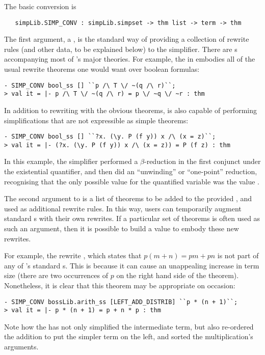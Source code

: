 The basic conversion is
\begin{hol}
\begin{verbatim}
   simpLib.SIMP_CONV : simpLib.simpset -> thm list -> term -> thm
\end{verbatim}
\end{hol}
The first argument, a \simpset, is the standard way of providing a
collection of rewrite rules (and other data, to be explained below) to
the simplifier.  There are \simpset{}s accompanying most of \HOL's
major theories.  For example, the \simpset{} 
in  embodies all of the usual rewrite theorems one would want over boolean
formulas:
\setcounter{sessioncount}{0}
\begin{session}
\begin{verbatim}
- SIMP_CONV bool_ss [] ``p /\ T \/ ~(q /\ r)``;
> val it = |- p /\ T \/ ~(q /\ r) = p \/ ~q \/ ~r : thm
\end{verbatim}
\end{session}
In addition to rewriting with the obvious theorems,  is
also capable of performing simplifications that are not expressible as
simple theorems:
\begin{session}
\begin{verbatim}
- SIMP_CONV bool_ss [] ``?x. (\y. P (f y)) x /\ (x = z)``;
> val it = |- (?x. (\y. P (f y)) x /\ (x = z)) = P (f z) : thm
\end{verbatim}
\end{session}
In this example, the simplifier performed a $\beta$-reduction in the
first conjunct under the existential quantifier, and then did an
``unwinding'' or ``one-point'' reduction, recognising that the only
possible value for the quantified variable  was the value
.

The second argument to  is a list of theorems to be
added to the provided \simpset, and used as additional rewrite rules.
In this way, users can temporarily augment standard \simpset{}s with
their own rewrites.  If a particular set of theorems is often used as
such an argument, then it is possible to build a \simpset{} value to
embody these new rewrites.

For example, the rewrite , which
states that $p(m + n) = pm + pn$ is not part of any of \HOL's standard
\simpset{}s.  This is because it can cause an unappealing increase in
term size (there are two occurrences of $p$ on the right hand
side of the theorem).  Nonetheless, it is clear that this theorem may
be appropriate on occasion:
\begin{session}
\begin{verbatim}
- SIMP_CONV bossLib.arith_ss [LEFT_ADD_DISTRIB] ``p * (n + 1)``;
> val it = |- p * (n + 1) = p + n * p : thm
\end{verbatim}
\end{session}
Note how the  \simpset{} has not only simplified the
intermediate  term, but also re-ordered the addition to
put the simpler term on the left, and sorted the multiplication's
arguments.


